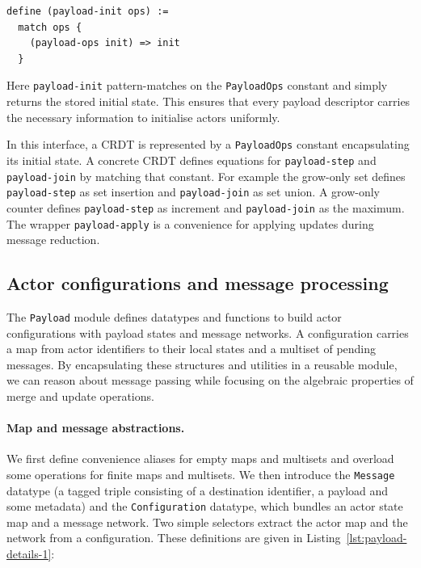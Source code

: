 \begin{lstlisting}[language=Athena,style=athena]
define (payload-init ops) :=
  match ops {
    (payload-ops init) => init
  }
\end{lstlisting}

\noindent Here \lstinline{payload-init} pattern-matches on the \lstinline{PayloadOps} constant and simply returns the stored initial state. This ensures that every payload descriptor carries the necessary information to initialise actors uniformly. %

\noindent In this interface, a CRDT is represented by a \lstinline{PayloadOps} constant encapsulating its initial state. A concrete CRDT defines equations for \lstinline{payload-step} and \lstinline{payload-join} by matching that constant. For example the grow-only set defines \lstinline{payload-step} as set insertion and \lstinline{payload-join} as set union. A grow-only counter defines \lstinline{payload-step} as increment and \lstinline{payload-join} as the maximum. The wrapper \lstinline{payload-apply} is a convenience for applying updates during message reduction.

\subsection{Actor configurations and message processing}

The \texttt{Payload} module defines datatypes and functions to build actor configurations with payload states and message networks. A configuration carries a map from actor identifiers to their local states and a multiset of pending messages. By encapsulating these structures and utilities in a reusable module, we can reason about message passing while focusing on the algebraic properties of merge and update operations.

\paragraph{Map and message abstractions.} We first define convenience aliases for empty maps and multisets and overload some operations for finite maps and multisets. We then introduce the \texttt{Message} datatype (a tagged triple consisting of a destination identifier, a payload and some metadata) and the \texttt{Configuration} datatype, which bundles an actor state map and a message network. Two simple selectors extract the actor map and the network from a configuration. These definitions are given in Listing~\ref{lst:payload-details-1}:

